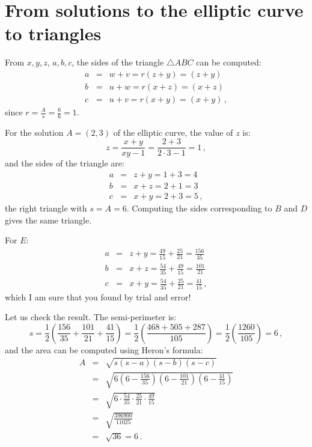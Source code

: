 \section{From solutions to the elliptic curve to triangles}

From $x,y,z$, $a,b,c$, the sides of the triangle $\triangle ABC$ can be computed:
\begin{eqnarray*}
a&=&w+v = r(z+y)=(z+y)\\
b&=&u+w= r(x+z)=(x+z)\\
c&=&u+v=r(x+y)=(x+y)\,,
\end{eqnarray*}
since $\displaystyle r=\frac{A}{s}=\frac{6}{6}=1$.

For the solution $A=(2,3)$ of the elliptic curve, the value of $z$ is:
\[
z=\frac{x+y}{xy-1}=\frac{2+3}{2\cdot 3-1}=1\,,
\]
and the sides of the triangle are:
\begin{eqnarray*}
a &=& z+y = 1+3 = 4\\
b &=& x+z = 2+1=3\\
c &=& x+y = 2+3=5\,,
\end{eqnarray*}
the right triangle with $s=A=6$. Computing the sides corresponding to $B$ and $D$ gives the same triangle.

For $E$:
\begin{eqnarray*}
a &=& z+y = \frac{49}{15} + \frac{25}{21} = \frac{156}{35}\\
b &=& x+z = \frac{54}{35} + \frac{49}{15} = \frac{101}{21}\\
c &=& x+y = \frac{54}{35} + \frac{25}{21}  = \frac{41}{15}\,,
\end{eqnarray*}
which I am sure that you found by trial and error!

Let us check the result. The semi-perimeter is:
\[
s=\frac{1}{2}\left(\frac{156}{35} + \frac{101}{21}+\frac{41}{15}\right) = \frac{1}{2}\left(\frac{468+505+287}{105}\right) = \frac{1}{2}\left(\frac{1260}{105}\right)= 6\,,
\]
and the area can be computed using Heron's formula:
\begin{eqnarray*}
A &=& \sqrt{s(s-a)(s-b)(s-c)}\\
&=& \sqrt{6 \left(6-\frac{156}{35}\right) \left(6-\frac{101}{21}\right) \left(6-\frac{41}{15}\right)}\\
&=& \sqrt{6 \cdot \frac{54}{35}\cdot \frac{25}{21} \cdot \frac{49}{15}}\\
&=& \sqrt{\frac{396900}{11025}}\\
&=& \sqrt{36} = 6\,.
\end{eqnarray*}


